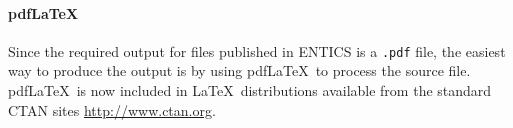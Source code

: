 \documentclass[twoside,11pt]{entics}
\begin{document}
%
%

\paragraph{pdf\LaTeX}
Since the required output for files published in ENTICS is a \texttt{.pdf}
file, the easiest way to produce the output is by using pdf\LaTeX\ to process
the source file. pdf\LaTeX\ is now included in \LaTeX\ distributions available
from the standard CTAN sites \url{http://www.ctan.org}.
\end{document}
